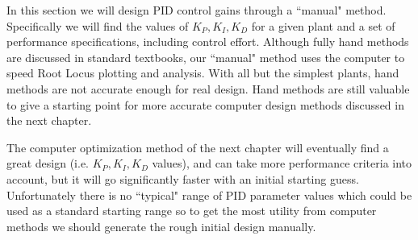 In this section we will design PID control gains through a ``manual" method.  Specifically we will find the values of $K_P, K_I, K_D$ for a given plant and a set of performance specifications, including control effort.  Although fully hand methods are discussed in standard textbooks, our ``manual" method uses the computer to speed Root Locus plotting and analysis.   With all but the simplest plants, hand methods are not accurate enough for real design.  Hand methods are still valuable to give a starting point for more accurate computer design methods discussed in the next chapter.

The computer optimization method of the next chapter will eventually find a great design (i.e. $K_P,K_I,K_D$ values), and can take more performance criteria into account, but it will go significantly faster with an initial starting guess.   Unfortunately there is no ``typical" range of PID parameter values which could be used as a standard starting range so to get the most utility from computer methods we should generate the rough initial design manually.


